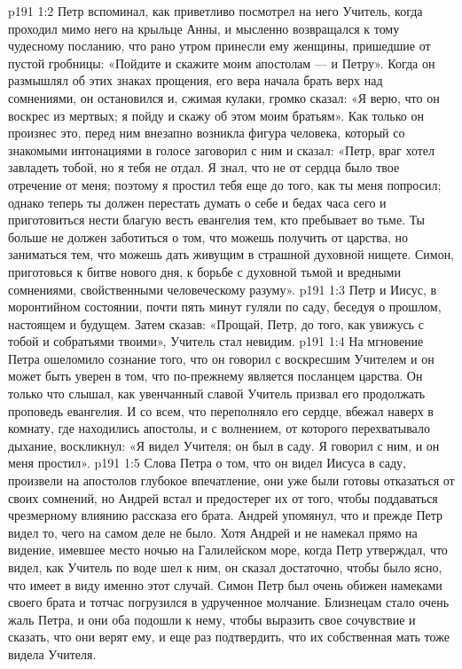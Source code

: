 \vs p191 1:2 Петр вспоминал, как приветливо посмотрел на него Учитель, когда проходил мимо него на крыльце Анны, и мысленно возвращался к тому чудесному посланию, что рано утром принесли ему женщины, пришедшие от пустой гробницы: «Пойдите и скажите моим апостолам --- и Петру». Когда он размышлял об этих знаках прощения, его вера начала брать верх над сомнениями, он остановился и, сжимая кулаки, громко сказал: «Я верю, что он воскрес из мертвых; я пойду и скажу об этом моим братьям». Как только он произнес это, перед ним внезапно возникла фигура человека, который со знакомыми интонациями в голосе заговорил с ним и сказал: «Петр, враг хотел завладеть тобой, но я тебя не отдал. Я знал, что не от сердца было твое отречение от меня; поэтому я простил тебя еще до того, как ты меня попросил; однако теперь ты должен перестать думать о себе и бедах часа сего и приготовиться нести благую весть евангелия тем, кто пребывает во тьме. Ты больше не должен заботиться о том, что можешь получить от царства, но заниматься тем, что можешь дать живущим в страшной духовной нищете. Симон, приготовься к битве нового дня, к борьбе с духовной тьмой и вредными сомнениями, свойственными человеческому разуму».
\vs p191 1:3 Петр и Иисус, в моронтийном состоянии, почти пять минут гуляли по саду, беседуя о прошлом, настоящем и будущем. Затем сказав: «Прощай, Петр, до того, как увижусь с тобой и собратьями твоими», Учитель стал невидим.
\vs p191 1:4 На мгновение Петра ошеломило сознание того, что он говорил с воскресшим Учителем и он может быть уверен в том, что по\hyp{}прежнему является посланцем царства. Он только что слышал, как увенчанный славой Учитель призвал его продолжать проповедь евангелия. И со всем, что переполняло его сердце, вбежал наверх в комнату, где находились апостолы, и с волнением, от которого перехватывало дыхание, воскликнул: «Я видел Учителя; он был в саду. Я говорил с ним, и он меня простил».
\vs p191 1:5 Слова Петра о том, что он видел Иисуса в саду, произвели на апостолов глубокое впечатление, они уже были готовы отказаться от своих сомнений, но Андрей встал и предостерег их от того, чтобы поддаваться чрезмерному влиянию рассказа его брата. Андрей упомянул, что и прежде Петр видел то, чего на самом деле не было. Хотя Андрей и не намекал прямо на видение, имевшее место ночью на Галилейском море, когда Петр утверждал, что видел, как Учитель по воде шел к ним, он сказал достаточно, чтобы было ясно, что имеет в виду именно этот случай. Симон Петр был очень обижен намеками своего брата и тотчас погрузился в удрученное молчание. Близнецам стало очень жаль Петра, и они оба подошли к нему, чтобы выразить свое сочувствие и сказать, что они верят ему, и еще раз подтвердить, что их собственная мать тоже видела Учителя.
